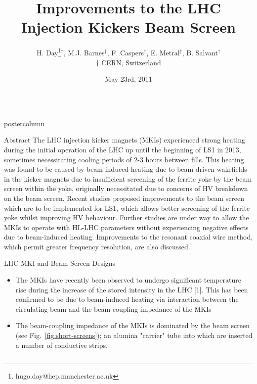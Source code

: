 \documentclass[final,hyperref={pdfpagelabels=false}]{beamer}
\title{Improvements to the LHC Injection Kickers Beam Screen}
\author{H. Day\thanks{hugo.day@hep.manchester.ac.uk}$^{\dagger}$, M.J. Barnes$^{\dagger}$, F. Caspers$^{\dagger}$, E. Metral$^{\dagger}$, B. Salvant$^{\dagger}$ \\
$\dagger$ CERN, Switzerland \\}
\date[May 23rd, 2011]{May 23rd, 2011}
\newlength{\columnheight}
\begin{document}
\begin{frame}
  \begin{columns}
    \begin{column}{.49\textwidth}
      \begin{beamercolorbox}[center,wd=\textwidth]{postercolumn}
        \begin{minipage}[T]{.95\textwidth}  %
          \parbox[t][\columnheight]{\textwidth}{ %
            \begin{block}{Abstract}
\small{
The LHC injection kicker magnets (MKIs) experienced strong heating during the initial operation of the LHC up until the beginning of LS1 in 2013, sometimes necessitating cooling periods of 2-3 hours between fills. This heating was found to be caused by beam-induced heating due to beam-driven wakefields in the kicker magnets due to insufficient screening of the ferrite yoke by the beam screen within the yoke, originally necessitated due to concerns of HV breakdown on the beam screen. Recent studies proposed improvements to the beam screen which are to be implemented for LS1, which allows better screening of the ferrite yoke whilst improving HV behaviour. Further studies are under way to allow the MKIs to operate with HL-LHC parameters without experiencing negative effects due to beam-induced heating. Improvements to the resonant coaxial wire method, which permit greater frequency resolution, are also discussed.
}
\end{block}
            \vfill

	\begin{block}{LHC-MKI and Beam Screen Designs}

	\begin{itemize}
	\item{The MKIs have recently been observed to undergo significant temperature rise during the increase of the stored intensity in the LHC [1]. This has been confirmed to be due to beam-induced heating via interaction between the circulating beam and the beam-coupling impedance of the MKIs}
	\item{The beam-coupling impedance of the MKIs is dominated by the beam screen (see Fig.~\ref{fig:short-screens}); an alumina "carrier" tube into which are inserted a number of conductive strips.}


\end{itemize}
\end{block}}
\end{minipage}
\end{beamercolorbox}
\end{column}
\end{columns}
\end{frame}
\end{document}

